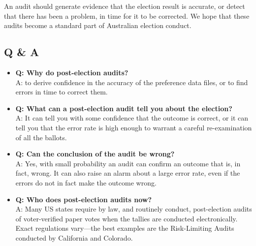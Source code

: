 \documentclass[10pt,a4paper]{article}
\begin{document}
An audit should generate evidence that the election result is accurate, or detect that there has been a problem, in time for it to be corrected.  We hope that these audits become a standard part of Australian election conduct.

\subsection{Q \& A}
\begin{itemize}
\item {\bf Q: Why do post-election audits?} \\ A: to derive confidence in the accuracy of the preference data files, or to find errors in time to correct them.
\item {\bf Q: What can a post-election audit tell you about the election?} \\ A: It can tell you with some confidence that the outcome is correct, or it can tell you that the error rate is high enough to warrant a careful re-examination of all the ballots.
\item {\bf Q: Can the conclusion of the audit be wrong?} \\ A: Yes, with small probability an audit can confirm an outcome that is, in fact, wrong.  It can also raise an alarm about a large error rate, even if the errors do not in fact make the outcome wrong.
\item {\bf Q: Who does post-election audits now?} \\
A: Many US states require by law, and routinely conduct, post-election audits of voter-verified paper votes when the tallies are conducted electronically.  Exact regulations vary---the best examples are the Risk-Limiting Audits \cite{bretschneider2012risk} conducted by California and Colorado.


\end{itemize}
\end{document}
